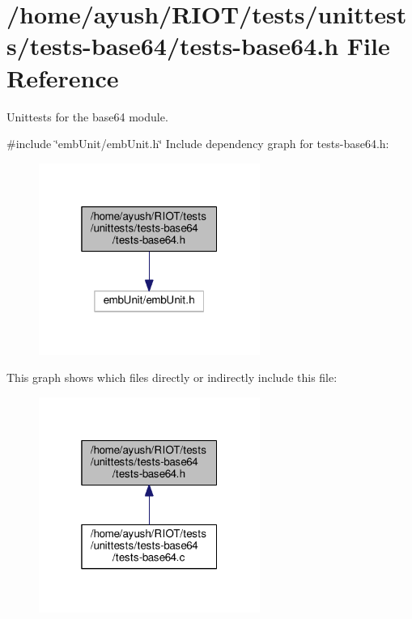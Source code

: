 \hypertarget{tests-base64_8h}{}\section{/home/ayush/\+R\+I\+O\+T/tests/unittests/tests-\/base64/tests-\/base64.h File Reference}
\label{tests-base64_8h}


Unittests for the {\ttfamily base64} module.  


{\ttfamily \#include \char`\"{}emb\+Unit/emb\+Unit.\+h\char`\"{}}\newline
Include dependency graph for tests-\/base64.h\+:
\nopagebreak
\begin{figure}[H]
\begin{center}
\leavevmode
\includegraphics[width=205pt]{tests-base64_8h__incl}
\end{center}
\end{figure}
This graph shows which files directly or indirectly include this file\+:
\nopagebreak
\begin{figure}[H]
\begin{center}
\leavevmode
\includegraphics[width=205pt]{tests-base64_8h__dep__incl}
\end{center}
\end{figure}
